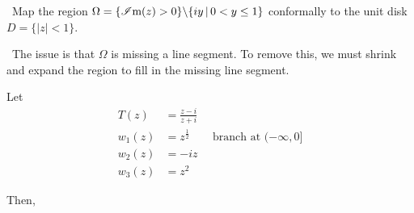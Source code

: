 \documentclass[12pt]{Qual}
\begin{document}
\begin{problem} $\,$
Map the region $\Omega=\{\mathscr{I}\text{m}(z)>0\}\backslash\{iy\,|\,0<y\le 1\}$ conformally to the unit disk $D=\{|z|<1\}$.
\end{problem}


\begin{solution}$\,$
The issue is that $\Omega$ is missing a line segment. To remove this, we must shrink and expand the region to fill in the missing line segment.

Let \begin{align*}
    T(z)&=\frac{z-i}{z+i}\\
    w_1(z)&=z^\frac{1}{2}\qquad\text{branch at }(-\infty,0]\\
    w_2(z)&=-iz\\
    w_3(z)&=z^2
\end{align*}

Then,


\end{solution}
\end{document}
